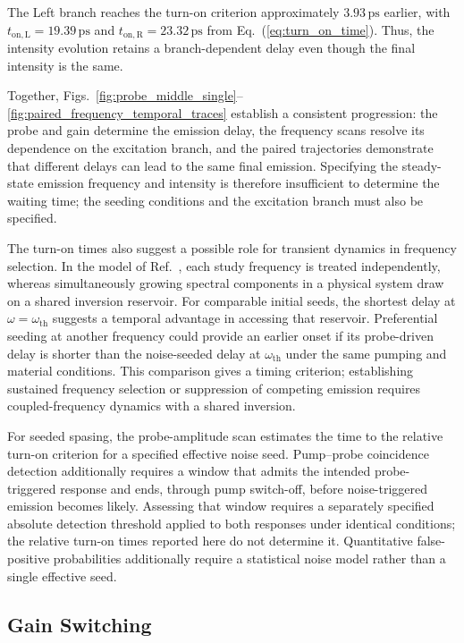 \documentclass{optica-article}
\begin{document}
The Left branch reaches the turn-on criterion approximately $3.93\,\mathrm{ps}$ earlier, with $t_{\mathrm{on,L}}=19.39\,\mathrm{ps}$ and $t_{\mathrm{on,R}}=23.32\,\mathrm{ps}$ from Eq.~(\ref{eq:turn_on_time}). Thus, the intensity evolution retains a branch-dependent delay even though the final intensity is the same.

Together, Figs.~\ref{fig:probe_middle_single}--\ref{fig:paired_frequency_temporal_traces} establish a consistent progression: the probe and gain determine the emission delay, the frequency scans resolve its dependence on the excitation branch, and the paired trajectories demonstrate that different delays can lead to the same final emission. Specifying the steady-state emission frequency and intensity is therefore insufficient to determine the waiting time; the seeding conditions and the excitation branch must also be specified. 

The turn-on times also suggest a possible role for transient dynamics in frequency selection. In the model of Ref.~\cite{Aradian:2024}, each study frequency is treated independently, whereas simultaneously growing spectral components in a physical system draw on a shared inversion reservoir. For comparable initial seeds, the shortest delay at $\omega=\omega_{\mathrm{th}}$ suggests a temporal advantage in accessing that reservoir. Preferential seeding at another frequency could provide an earlier onset if its probe-driven delay is shorter than the noise-seeded delay at $\omega_{\mathrm{th}}$ under the same pumping and material conditions. This comparison gives a timing criterion; establishing sustained frequency selection or suppression of competing emission requires coupled-frequency dynamics with a shared inversion.

For seeded spasing, the probe-amplitude scan estimates the time to the relative turn-on criterion for a specified effective noise seed. Pump--probe coincidence detection additionally requires a window that admits the intended probe-triggered response and ends, through pump switch-off, before noise-triggered emission becomes likely. Assessing that window requires a separately specified absolute detection threshold applied to both responses under identical conditions; the relative turn-on times reported here do not determine it. Quantitative false-positive probabilities additionally require a statistical noise model rather than a single effective seed.

\subsection{Gain Switching}
\label{sec:gain_switching}
\end{document}
